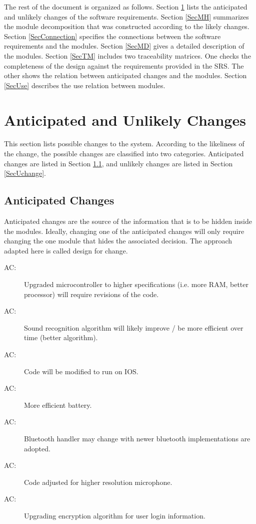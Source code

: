 \documentclass[12pt, titlepage]{article}
\newcounter{acnum}
\newcommand{\actheacnum}{AC\theacnum}
\begin{document}
The rest of the document is organized as follows. Section
\ref{SecChange} lists the anticipated and unlikely changes of the software
requirements. Section \ref{SecMH} summarizes the module decomposition that
was constructed according to the likely changes. Section \ref{SecConnection}
specifies the connections between the software requirements and the
modules. Section \ref{SecMD} gives a detailed description of the
modules. Section \ref{SecTM} includes two traceability matrices. One checks
the completeness of the design against the requirements provided in the SRS. The
other shows the relation between anticipated changes and the modules. Section
\ref{SecUse} describes the use relation between modules.

\section{Anticipated and Unlikely Changes} \label{SecChange}

This section lists possible changes to the system. According to the likeliness
of the change, the possible changes are classified into two
categories. Anticipated changes are listed in Section \ref{SecAchange}, and
unlikely changes are listed in Section \ref{SecUchange}.

\subsection{Anticipated Changes} \label{SecAchange}

Anticipated changes are the source of the information that is to be hidden
inside the modules. Ideally, changing one of the anticipated changes will only
require changing the one module that hides the associated decision. The approach
adapted here is called design for
change.

\begin{description}
\item[ \actheacnum \label{ac1}:] Upgraded microcontroller to higher specifications (i.e. more RAM, better processor) will require revisions of the code.
\item[ \actheacnum \label{ac2}:] Sound recognition algorithm will likely improve / be more efficient over time (better algorithm).
\item[ \actheacnum \label{ac3}:] Code will be modified to run on IOS.
\item[ \actheacnum \label{ac4}:] More efficient battery.
\item[ \actheacnum \label{ac5}:] Bluetooth handler may change with newer bluetooth implementations are adopted.
\item[ \actheacnum \label{ac6}:] Code adjusted for higher resolution microphone.
\item[ \actheacnum \label{ac7}:] Upgrading encryption algorithm for user login information.
\end{description}
\end{document}
